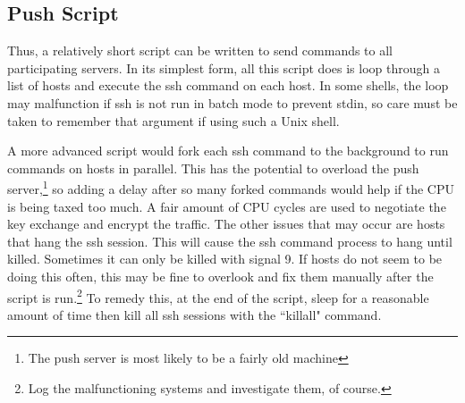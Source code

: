 \subsection{Push Script}
Thus, a relatively short script can be written to send commands to all participating servers.  In its simplest form, all this script does is loop through a list of hosts and execute the ssh command on each host.  In some shells, the loop may malfunction if ssh is not run in batch mode to prevent stdin, so care must be taken to remember that argument if using such a Unix shell.  

A more advanced script would fork each ssh command to the background to run commands on hosts in parallel.  This has the potential to overload the push server,\footnote{The push server is most likely to be a fairly old machine} so adding a delay after so many forked commands would help if the CPU is being taxed too much.  A fair amount of CPU cycles are used to negotiate the key exchange and encrypt the traffic.  The other issues that may occur are hosts that hang the ssh session.  This will cause the ssh command process to hang until killed.  Sometimes it can only be killed with signal 9.  If hosts do not seem to be doing this often, this may be fine to overlook and fix them manually after the script is run.\footnote{Log the malfunctioning systems and investigate them, of course.}  To remedy this, at the end of the script, sleep for a reasonable amount of time then kill all ssh sessions with the ``killall" command.  

